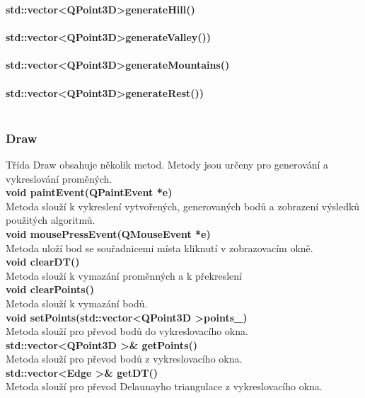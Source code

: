 \documentclass[a4paper, 12pt]{article}
\begin{document}
\textbf{std::vector\textless QPoint3D\textgreater generateHill()}\\
\\

\textbf{std::vector\textless QPoint3D\textgreater generateValley())}\\
\\

\textbf{std::vector\textless QPoint3D\textgreater generateMountains()}\\
\\

\textbf{std::vector\textless QPoint3D\textgreater generateRest())}\\
\\

\subsubsection{Draw}
Třída Draw obsahuje několik metod. Metody jsou určeny pro generování a vykreslování proměných.
\\

\textbf{void paintEvent(QPaintEvent *e)}\\
Metoda slouží k vykreslení vytvořených, generovaných bodů a zobrazení výsledků použitých algoritmů.
\\

\textbf{void mousePressEvent(QMouseEvent *e)}\\
Metoda uloží bod se souřadnicemi místa kliknutí v zobrazovacím okně.
\\

\textbf{void clearDT()}\\
Metoda slouží k vymazání proměnných a k překreslení
\\

\textbf{void clearPoints()}\\
Metoda slouží k vymazání bodů.
\\

\textbf{void setPoints(std::vector\textless QPoint3D \textgreater points\_)}\\
Metoda slouží pro převod bodů do vykreslovacího okna.\\

\textbf{std::vector\textless QPoint3D \textgreater \& getPoints()}\\
Metoda slouží pro převod bodů z vykreslovacího okna.\\

\textbf{std::vector\textless Edge \textgreater \& getDT()}\\
Metoda slouží pro převod Delaunayho triangulace z vykreslovacího okna.\\
\end{document}
